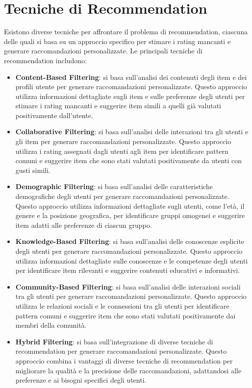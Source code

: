 \documentclass{report}
\begin{document}
	\section{Tecniche di Recommendation}
	Esistono diverse tecniche per affrontare il problema di recommendation, ciascuna delle quali si basa su un approccio specifico per stimare i rating mancanti e generare raccomandazioni personalizzate. Le principali tecniche di recommendation includono:
	\begin{itemize}
		\item \textbf{Content-Based Filtering}: si basa sull'analisi dei contenuti degli item e dei profili utente per generare raccomandazioni personalizzate. Questo approccio utilizza informazioni dettagliate sugli item e sulle preferenze degli utenti per stimare i rating mancanti e suggerire item simili a quelli già valutati positivamente dall'utente.
		\item \textbf{Collaborative Filtering}: si basa sull'analisi delle interazioni tra gli utenti e gli item per generare raccomandazioni personalizzate. Questo approccio utilizza i rating assegnati dagli utenti agli item per identificare pattern comuni e suggerire item che sono stati valutati positivamente da utenti con gusti simili. 
		\item \textbf{Demographic Filtering}: si basa sull'analisi delle caratteristiche demografiche degli utenti per generare raccomandazioni personalizzate. Questo approccio utilizza informazioni dettagliate sugli utenti, come l'età, il genere e la posizione geografica, per identificare gruppi omogenei e suggerire item adatti alle preferenze di ciascun gruppo.
		\item \textbf{Knowledge-Based Filtering}: si basa sull'analisi delle conoscenze esplicite degli utenti per generare raccomandazioni personalizzate. Questo approccio utilizza informazioni dettagliate sulle conoscenze e le competenze degli utenti per identificare item rilevanti e suggerire contenuti educativi e informativi.
		\item \textbf{Community-Based Filtering}: si basa sull'analisi delle interazioni sociali tra gli utenti per generare raccomandazioni personalizzate. Questo approccio utilizza le relazioni sociali e le connessioni tra gli utenti per identificare pattern comuni e suggerire item che sono stati valutati positivamente dai membri della comunità.
		\item \textbf{Hybrid Filtering}: si basa sull'integrazione di diverse tecniche di recommendation per generare raccomandazioni personalizzate. Questo approccio combina i vantaggi di diverse tecniche di recommendation per migliorare la qualità e la precisione delle raccomandazioni, adattandosi alle preferenze e ai bisogni specifici degli utenti.
	\end{itemize}
\end{document}
